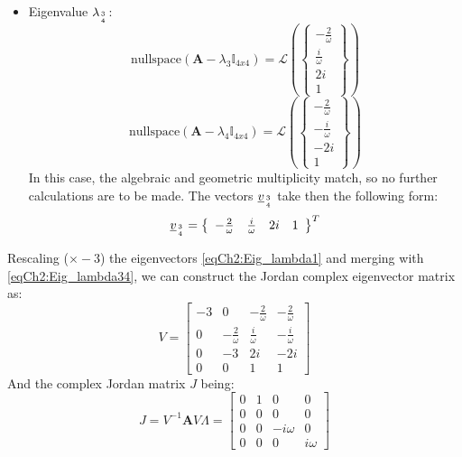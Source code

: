 \begin{itemize}
			\item[\GMVred{$\bullet$}]Eigenvalue $\lambda_{3\atop 4}$: 
			\[
			\text{nullspace}\left(\bm A - \lambda_{3} \mathbb{I}_{4x4}\right) =  \mathcal{L}\left( \left\{ \begin{array}{c} -\frac{2}{\omega} \\ \frac{i}{\omega} \\ 2 i \\ 1 \end{array}\right\} \right)
			\]
			\[
			\text{nullspace}\left(\bm A - \lambda_{4} \mathbb{I}_{4x4}\right) =  \mathcal{L}\left( \left\{ \begin{array}{c} -\frac{2}{\omega} \\ -\frac{i}{\omega} \\ -2 i \\ 1 \end{array}\right\} \right)
			\]
			\indent In this case, the algebraic and geometric multiplicity match, so no further calculations are to be made. The vectors $\underline{v}_{3\atop 4}$ take then the following form:
			\begin{equation}
			\label{eqCh2:Eig_lambda34}
			\underline{v}_{3\atop 4} = \left\{ \begin{array}{cccc} -\frac{2}{\omega} & \frac{i}{\omega} & 2 i  & 1 \end{array}\right\}^T
			\end{equation}
			\end{itemize}
			\indent Rescaling ($\times -3$) the eigenvectors \eqref{eqCh2:Eig_lambda1} and merging with \eqref{eqCh2:Eig_lambda34}, we can construct the Jordan complex eigenvector matrix as:
			\[
			V = \left[ \begin{array}{cccc}
			-3 	& 0					& -\frac{2}{\omega}	& -\frac{2}{\omega}	 	\\
			0 	& -\frac{2}{\omega}	&  \frac{i}{\omega} & -\frac{i}{\omega} 	\\
			0 	& -3				& 2i				& -2i 					\\
			0 	& 0					& 1 				& 1
			\end{array}\right]
			\]
			\indent And the complex Jordan matrix $J$ being:
			\begin{equation}
			J = V^{-1} \bm A V
			\Lambda = \left[ \begin{array}{cccc}
			0 	& 1					& 0					& 0		\\
			0 	& 0					& 0 				& 0 	\\
			0 	& 0					& -i\omega			& 0 	\\
			0 	& 0					& 0 				& i\omega
			\end{array}\right]
			\label{eqCh2:Comp_lambda}
			\end{equation}
